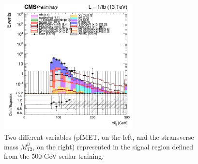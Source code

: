 \documentclass[a4paper, 10pt, openright]{report}
\begin{document}
\begin{figure}[htbp]
{\begin{minipage}[b]{.48\textwidth}
\end{minipage}\hfill
\begin{minipage}[b]{.48\textwidth}
\includegraphics[width=7cm, height=7cm]{figs/log_cratio_topCR_ll_DNN_signal0_scalar100_mt2ll_2017.png}
\end{minipage} \hfill
}
\caption{Two different variables (pf\ac{MET}, on the left, and the stransverse mass $M_{T2}^{ll}$, on the right) represented in the signal region defined from the 500 GeV scalar training.}
\label{fig:SR2}
\end{figure}
\end{document}
